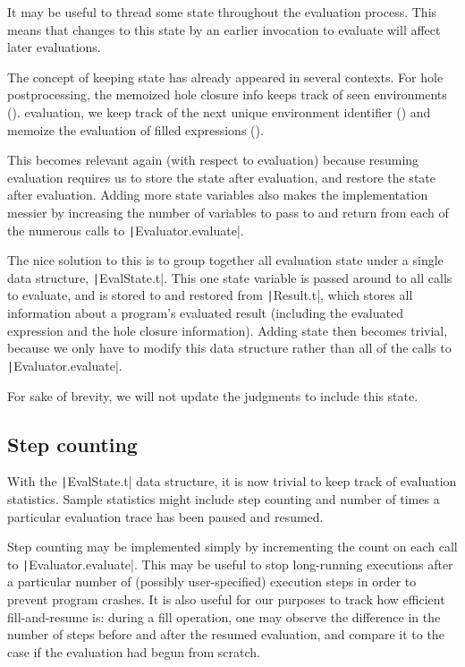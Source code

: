 It may be useful to thread some state throughout the evaluation process. This means that changes to this state by an earlier invocation to evaluate will affect later evaluations.

The concept of keeping state has already appeared in several contexts. For hole postprocessing, the memoized hole closure info keeps track of seen environments (). evaluation, we keep track of the next unique environment identifier () and memoize the evaluation of filled expressions ().

This becomes relevant again (with respect to evaluation) because resuming evaluation requires us to store the state after evaluation, and restore the state after evaluation. Adding more state variables also makes the implementation messier by increasing the number of variables to pass to and return from each of the numerous calls to \texttt|Evaluator.evaluate|.

The nice solution to this is to group together all evaluation state under a single data structure, \texttt|EvalState.t|. This one state variable is passed around to all calls to evaluate, and is stored to and restored from \texttt|Result.t|, which stores all information about a program's evaluated result (including the evaluated expression and the hole closure information). Adding state then becomes trivial, because we only have to modify this data structure rather than all of the calls to \texttt|Evaluator.evaluate|.

For sake of brevity, we will not update the judgments to include this state.

\subsection{Step counting}
\label{sec:step-counting}

With the \texttt|EvalState.t| data structure, it is now trivial to keep track of evaluation statistics. Sample statistics might include step counting and number of times a particular evaluation trace has been paused and resumed.

Step counting may be implemented simply by incrementing the count on each call to \texttt|Evaluator.evaluate|. This may be useful to stop long-running executions after a particular number of (possibly user-specified) execution steps in order to prevent program crashes. It is also useful for our purposes to track how efficient fill-and-resume is: during a fill operation, one may observe the difference in the number of steps before and after the resumed evaluation, and compare it to the case if the evaluation had begun from scratch.

